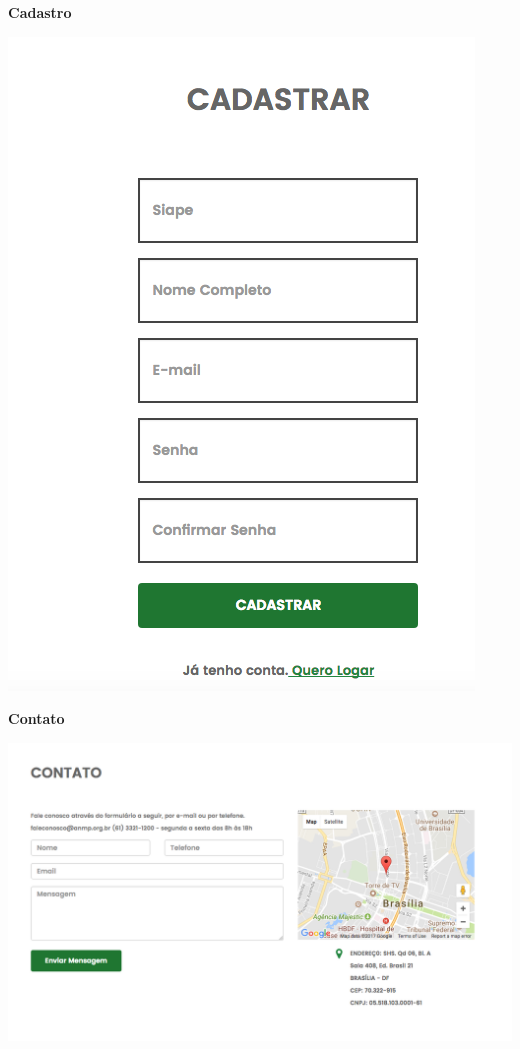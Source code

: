 \textbf{Cadastro}

\includegraphics[keepaspectratio=true,scale=0.3]{figuras/cadastro.png}

\textbf{Contato}

\includegraphics[keepaspectratio=true,scale=0.3]{figuras/contato.png}

